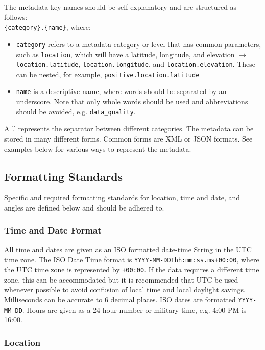 \documentclass[12pt]{article}
\begin{document}
The metadata key names should be self-explanatory and are structured as follows:\\ \verb|{category}.{name}|, where:
\begin{itemize}
	\item \verb|category| refers to a metadata category or level that has common parameters, such as \verb|location|, which will have a latitude, longitude, and elevation $\longrightarrow$ \verb|location.latitude|, \verb|location.longitude|, and \verb|location.elevation|.  These can be nested, for example, \verb|positive.location.latitude|
	\item \verb|name| is a descriptive name, where words should be separated by an underscore. Note that only whole words should be used and abbreviations should be avoided, e.g. \verb|data_quality|.  
\end{itemize}  

A '.' represents the separator between different categories.  The metadata can be stored in many different forms.  Common forms are XML or JSON formats.  See examples below for various ways to represent the metadata.      

\subsection{Formatting Standards}

Specific and required formatting standards for location, time and date, and angles are defined below and should be adhered to.

\subsubsection{Time and Date Format}

All time and dates are given as an ISO formatted date-time String in the UTC time zone.  The ISO Date Time format is \verb|YYYY-MM-DDThh:mm:ss.ms+00:00|, where the UTC time zone is represented by \verb|+00:00|. If the data requires a different time zone, this can be accommodated but it is recommended that UTC be used whenever possible to avoid confusion of local time and local daylight savings. Milliseconds can be accurate to 6 decimal places.  ISO dates are formatted \verb|YYYY-MM-DD|.  Hours are given as a 24 hour number or military time, e.g. 4:00 PM is 16:00.

\subsubsection{Location}
\end{document}

